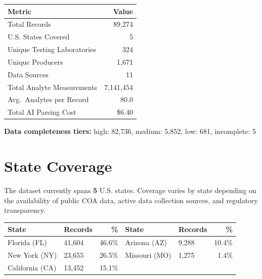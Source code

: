 \documentclass[11pt,letterpaper]{article}
\begin{document}
\vspace{1em}

{\small
\renewcommand{\arraystretch}{1.4}
\begin{tabularx}{\textwidth}{@{}Xr@{}}
\toprule
\textbf{Metric} & \textbf{Value} \\
\midrule
Total Records & 89,274 \\
U.S. States Covered & 5 \\
Unique Testing Laboratories & 324 \\
Unique Producers & 1,671 \\
Data Sources & 11 \\
Total Analyte Measurements & 7,141,454 \\
Avg.\ Analytes per Record & 80.0 \\
Total AI Parsing Cost & \$6.40 \\
\bottomrule
\end{tabularx}
}

\vspace{0.5em}

\noindent\textbf{Data completeness tiers:} high: 82,736, medium: 5,852, low: 681, incomplete: 5

\section{State Coverage}

The dataset currently spans \textbf{5} U.S.
states. Coverage varies by state depending on the availability of
public COA data, active data collection sources, and regulatory
transparency.

\vspace{1em}

{\small
\renewcommand{\arraystretch}{1.2}
\begin{tabularx}{\textwidth}{@{}Xlr|Xlr@{}}
\toprule
\textbf{State} & \textbf{Records} & \textbf{\%} & \textbf{State} & \textbf{Records} & \textbf{\%} \\
\midrule
Florida (FL) & 41,604 & 46.6\% & Arizona (AZ) & 9,288 & 10.4\% \\
New York (NY) & 23,655 & 26.5\% & Missouri (MO) & 1,275 & 1.4\% \\
California (CA) & 13,452 & 15.1\% & & & \\
\bottomrule
\end{tabularx}
}
\end{document}
